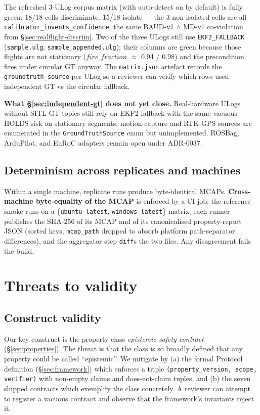 \documentclass[11pt,a4paper]{article}
\begin{document}
The refreshed 3-ULog corpus matrix (with auto-detect on by
default) is fully green: 18/18 cells discriminate. 15/18 isolate
--- the 3 non-isolated cells are all
\texttt{calibrator\_invents\_confidence}, the same BAUD-v1 $\wedge$
MD-v1 co-violation from \S\ref{sec:realflight-discrim}. Two of
the three ULogs still use \texttt{EKF2\_FALLBACK}
(\texttt{sample.ulg}, \texttt{sample\_appended.ulg}); their
columns are green because those flights are not stationary
($\mathit{fire\_fraction}$ $\approx$ 0.94 / 0.98) and the
precondition fires under circular GT anyway. The
\texttt{matrix.json} artefact records the
\texttt{groundtruth\_source} per ULog so a reviewer can verify
which rows used independent GT vs the circular fallback.

\textbf{What \S\ref{sec:independent-gt} does not yet close.}
Real-hardware ULogs without SITL GT topics still rely on EKF2
fallback with the same vacuous-HOLDS risk on stationary
segments; motion-capture and RTK-GPS sources are enumerated in
the \texttt{GroundTruthSource} enum but unimplemented. ROSBag,
ArduPilot, and EuRoC adapters remain open under ADR-0037.

\subsection{Determinism across replicates and machines}
Within a single machine, replicate runs produce byte-identical
MCAPs. \textbf{Cross-machine byte-equality of the MCAP} is enforced
by a CI job: the reference smoke runs on a \{\texttt{ubuntu-latest},
\texttt{windows-latest}\} matrix, each runner publishes the SHA-256
of its MCAP and of its canonicalised property-report JSON (sorted
keys, \texttt{mcap\_path} dropped to absorb platform path-separator
differences), and the aggregator step \texttt{diff}s the two files.
Any disagreement fails the build.

\section{Threats to validity}

\subsection{Construct validity}

Our key construct is the property class \emph{epistemic safety
contract} (\S\ref{sec:properties}). The threat is that the
class is so broadly defined that any property could be called
``epistemic''. We mitigate by (a) the formal Protocol
definition (\S\ref{sec:framework}) which enforces a triple
\texttt{(property\_version, scope, verifier)} with non-empty
claims and does-not-claim tuples, and (b) the seven shipped
contracts which exemplify the class concretely. A reviewer can
attempt to register a vacuous contract and observe that the
framework's invariants reject it.
\end{document}
